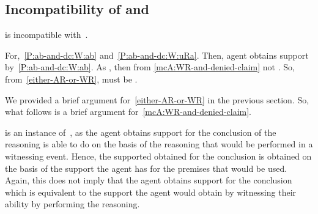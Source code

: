 \subsection{Incompatibility of \WR{} and \uRa{}}
\label{sec:incomp-wr-ura}

\begin{note}[Proposition]
   \begin{proposition}\label{mcA:WR-and-denied-claim}
    \WR{} is incompatible with~\uRa{}.
  \end{proposition}
    For,~\ref{P:ab-and-dc:W:ab} and~\ref{P:ab-and-dc:W:uRa}.
  Then, agent obtains support by~\ref{P:ab-and-dc:W:ab}.
  As \uRa{}, then from \ref{mcA:WR-and-denied-claim} not \WR{}.
  So, from~\ref{either-AR-or-WR}, must be \AR{}.
\end{note}

\begin{note}[To argument]
  {
    \color{red}
    We provided a brief argument for~\ref{either-AR-or-WR} in the previous section.
  }
  So, what follows is a brief argument for~\ref{mcA:WR-and-denied-claim}.
\end{note}

\begin{note}[Attribute]
  \WR{} is an instance of~\rC{}, as the agent obtains support for the conclusion of the reasoning is able to do on the basis of the reasoning that would be performed in a witnessing event.
  Hence, the supported obtained for the conclusion is obtained on the basis of the support the agent has for the premises that would be used.
  Again, this does not imply that the agent obtains support for the conclusion which is equivalent to the support the agent would obtain by witnessing their ability by performing the reasoning.
\end{note}


